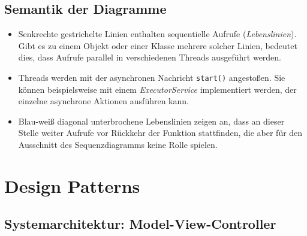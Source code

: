 \documentclass[10pt]{scrreprt}
\begin{document}
\newpage

\section*{Semantik der Diagramme}
\begin{itemize}
\item Senkrechte gestrichelte Linien enthalten sequentielle Aufrufe (\textit{Lebenslinien}). Gibt es zu einem Objekt oder einer Klasse mehrere solcher Linien, bedeutet dies, dass Aufrufe parallel in verschiedenen Threads ausgeführt werden.
\item Threads werden mit der asynchronen Nachricht \texttt{start()} angestoßen. Sie können beispielsweise mit einem \textit{ExecutorService} implementiert werden, der einzelne asynchrone Aktionen ausführen kann.
\item Blau-weiß diagonal unterbrochene Lebenslinien zeigen an, dass an dieser Stelle weiter Aufrufe vor Rückkehr der Funktion stattfinden, die aber für den Ausschnitt des Sequenzdiagramms keine Rolle spielen.
\end{itemize}


\chapter{Design Patterns}

\section{Systemarchitektur: Model-View-Controller}
\end{document}
